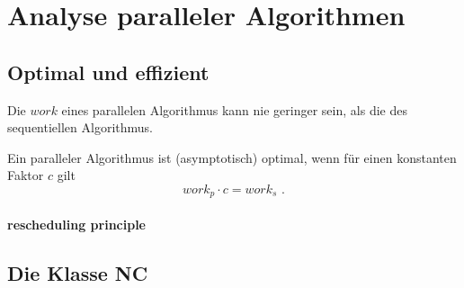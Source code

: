 \section{Analyse paralleler Algorithmen}

\subsection{Optimal und effizient}
Die $work$ eines parallelen Algorithmus kann nie geringer sein, als die des sequentiellen Algorithmus.

Ein paralleler Algorithmus ist (asymptotisch) optimal, wenn für einen konstanten Faktor $c$ gilt
\begin{equation}
    work_p \cdot c = work_s \text{ .}
\end{equation}


\paragraph{rescheduling principle}


\subsection{Die Klasse NC}
